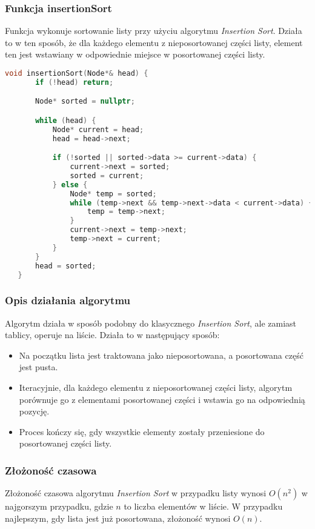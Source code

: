 \documentclass[a4paper,12pt]{article}
\begin{document}
\subsubsection{Funkcja insertionSort}
   Funkcja wykonuje sortowanie listy przy użyciu algorytmu \textit{Insertion Sort}. Działa to w ten sposób, że dla każdego elementu z nieposortowanej części listy, element ten jest wstawiany w odpowiednie miejsce w posortowanej części listy.
   \begin{lstlisting}[language=C++]
   void insertionSort(Node*& head) {
       if (!head) return;

       Node* sorted = nullptr;

       while (head) {
           Node* current = head;
           head = head->next;

           if (!sorted || sorted->data >= current->data) {
               current->next = sorted;
               sorted = current;
           } else {
               Node* temp = sorted;
               while (temp->next && temp->next->data < current->data) {
                   temp = temp->next;
               }
               current->next = temp->next;
               temp->next = current;
           }
       }
       head = sorted;
   }
   \end{lstlisting}

\subsubsection{Opis działania algorytmu}
Algorytm działa w sposób podobny do klasycznego \textit{Insertion Sort}, ale zamiast tablicy, operuje na liście. Działa to w następujący sposób:

\begin{itemize}
    \item Na początku lista jest traktowana jako nieposortowana, a posortowana część jest pusta.
    \item Iteracyjnie, dla każdego elementu z nieposortowanej części listy, algorytm porównuje go z elementami posortowanej części i wstawia go na odpowiednią pozycję.
    \item Proces kończy się, gdy wszystkie elementy zostały przeniesione do posortowanej części listy.
\end{itemize}

\subsubsection{Złożoność czasowa}
Złożoność czasowa algorytmu \textit{Insertion Sort} w przypadku listy  wynosi \(O(n^2)\) w najgorszym przypadku, gdzie \(n\) to liczba elementów w liście. W przypadku najlepszym, gdy lista jest już posortowana, złożoność wynosi \(O(n)\).
\end{document}
